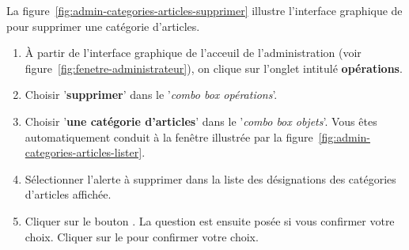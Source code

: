 La figure~\ref{fig:admin-categories-articles-supprimer} illustre
l'interface graphique de \yeren pour supprimer une
cat\'egorie d'articles.

\begin{enumerate}[1)]
	\item \`A partir de l'interface graphique de l'acceuil de
		l'administration (voir figure~\ref{fig:fenetre-administrateur}),
		on clique sur l'onglet intitul\'e \textbf{op\'erations}. 
		
	\item Choisir '\textbf{supprimer}' dans le '\emph{combo box
		op\'erations}'.
		
	\item Choisir '\textbf{une cat\'egorie d'articles}' dans le
		'\emph{combo box objets}'. Vous \^etes automatiquement
		conduit \`a la fen\^etre illustr\'ee par la
		figure~\ref{fig:admin-categories-articles-lister}.
		
	\item S\'electionner l'alerte \`a supprimer dans la liste
		des d\'esignations des cat\'egories d'articles affich\'ee.
		
	\item Cliquer sur le bouton . La question
		est ensuite pos\'ee si vous confirmer votre choix.
		Cliquer sur le  pour confirmer votre choix.
\end{enumerate}

